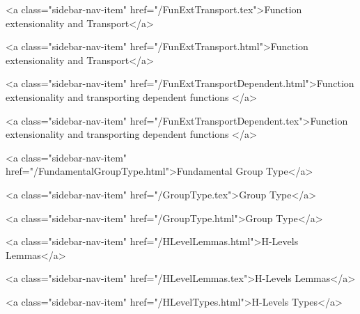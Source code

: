       
    
      
        
          <a class="sidebar-nav-item" href="/FunExtTransport.tex">Function extensionality and Transport</a>
        
      
    
      
        
          <a class="sidebar-nav-item" href="/FunExtTransport.html">Function extensionality and Transport</a>
        
      
    
      
        
          <a class="sidebar-nav-item" href="/FunExtTransportDependent.html">Function extensionality and transporting dependent functions </a>
        
      
    
      
        
          <a class="sidebar-nav-item" href="/FunExtTransportDependent.tex">Function extensionality and transporting dependent functions </a>
        
      
    
      
        
          <a class="sidebar-nav-item" href="/FundamentalGroupType.html">Fundamental Group Type</a>
        
      
    
      
        
          <a class="sidebar-nav-item" href="/GroupType.tex">Group Type</a>
        
      
    
      
        
          <a class="sidebar-nav-item" href="/GroupType.html">Group Type</a>
        
      
    
      
        
          <a class="sidebar-nav-item" href="/HLevelLemmas.html">H-Levels Lemmas</a>
        
      
    
      
        
          <a class="sidebar-nav-item" href="/HLevelLemmas.tex">H-Levels Lemmas</a>
        
      
    
      
        
          <a class="sidebar-nav-item" href="/HLevelTypes.html">H-Levels Types</a>
        
      
    
